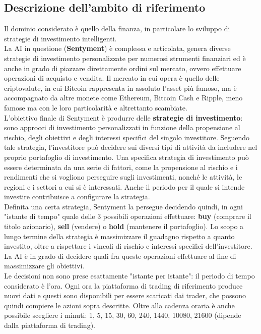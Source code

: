 \documentclass{article}
\numberwithin{equation}{section}
\begin{document}
	\subsection{Descrizione dell'ambito di riferimento}
		Il dominio considerato è quello della finanza, in particolare lo sviluppo di strategie di investimento intelligenti.\\
		La AI in questione (\textbf{Sentyment}) è complessa e articolata, genera diverse strategie di investimento personalizzate per numerosi strumenti finanziari ed è anche in grado di piazzare direttamente ordini sul mercato, ovvero effettuare operazioni di acquisto e vendita. Il mercato in cui opera è quello delle criptovalute, in cui Bitcoin rappresenta in assoluto l'asset più famoso, ma è accompagnato da altre monete come Ethereum, Bitcoin Cash e Ripple, meno famose ma con le loro particolarità e altrettanto scambiate.\\
		L'obiettivo finale di Sentyment è produrre delle \textbf{strategie di investimento}: sono approcci di investimento personalizzati in funzione della propensione al rischio, degli obiettivi e degli interessi specifici del singolo investitore. Seguendo tale strategia, l’investitore può decidere sui diversi tipi di attività da includere nel proprio portafoglio di investimento. Una specifica strategia di investimento può essere determinata da una serie di fattori, come la propensione al rischio e i rendimenti che si vogliono perseguire sugli investimenti, nonché le attività, le regioni e i settori a cui si è interessati. Anche il periodo per il quale si intende investire contribuisce a configurare la strategia.\\
		Definita una certa strategia, Sentyment la persegue decidendo quindi, in ogni "istante di tempo" quale delle 3 possibili operazioni effettuare: \textbf{buy} (comprare il titolo azionario), \textbf{sell} (vendere) o \textbf{hold} (mantenere il portafoglio). Lo scopo a lungo termine della strategia è massimizzare il guadagno rispetto a quanto investito, oltre a rispettare i vincoli di rischio e interessi specifici dell'investitore. La AI è in grado di decidere quali fra queste operazioni effettuare al fine di massimizzare gli obiettivi.\\
		Le decisioni non sono prese esattamente "istante per istante": il periodo di tempo considerato è l'ora. Ogni ora la piattaforma di trading di riferimento produce nuovi dati e questi sono disponibili per essere scaricati dai trader, che possono quindi compiere le azioni sopra descritte. Oltre alla cadenza oraria è anche possibile scegliere i minuti: 1, 5, 15, 30, 60, 240, 1440, 10080, 21600 (dipende dalla piattaforma di trading).\\
		
\end{document}
